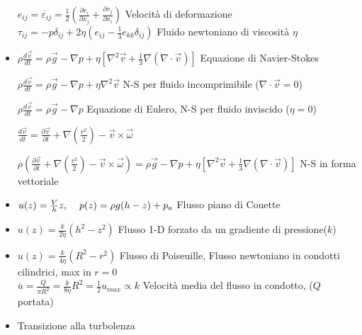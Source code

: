 \documentclass[a4paper]{article}
\begin{document}
\begin{itemize}
	$e_{ij}= \dot{\varepsilon_{ij}}= \frac{1}{2}(\frac{\partial v_i}{\partial x_j}+\frac{\partial v_j}{\partial x_i})$ Velocità di deformazione\\
	$\tau_{ij}=-p \delta_{ij} + 2 \eta (e_{ij}-\frac{1}{3}e_{kk}\delta_{ij})$ Fluido newtoniano di viscosità $\eta$
	
	\item $\rho \frac{d \overrightarrow{v}}{dt} = \rho \overrightarrow{g}- \nabla p + \eta[\nabla^2 \overrightarrow{v} + \frac{1}{3}\nabla(\nabla \cdot \overrightarrow{v})]$ \hspace{0.3cm} Equazione di Navier-Stokes
	
	$\rho \frac{d \overrightarrow{v}}{dt} = \rho \overrightarrow{g}- \nabla p + \eta\nabla^2 \overrightarrow{v}$ \hspace{0.3cm} N-S per fluido incomprimibile ($\nabla \cdot \overrightarrow{v}=0$)
	
	$\rho \frac{d \overrightarrow{v}}{dt} = \rho \overrightarrow{g}- \nabla p$ \hspace{0.3cm} Equazione di Eulero, N-S per fluido inviscido ($\eta = 0$)
	
	$\frac{d\overrightarrow{v}}{dt}=\frac{\partial \overrightarrow{v}}{\partial t}+\nabla (\frac{v^2}{2})-\overrightarrow{v} \times \overrightarrow{\omega}$
	
	$\rho  (\frac{\partial \overrightarrow{v}}{\partial t}+\nabla (\frac{v^2}{2})-\overrightarrow{v} \times \overrightarrow{\omega}) = \rho \overrightarrow{g}- \nabla p + \eta[\nabla^2 \overrightarrow{v} + \frac{1}{3}\nabla(\nabla \cdot \overrightarrow{v})]$ \hspace{0.3cm} N-S in forma vettoriale
	
	\item $u(z) = \frac{V}{h}z, \hspace{0.4cm} p(z)=\rho g (h-z)+p_a$ Flusso piano di Couette
	
	\item $u(z)=\frac{k}{2 \eta} (h^2-z^2) $ Flusso 1-D forzato da un gradiente di pressione($k$)
	
	\item $u(z)=\frac{k}{4 \eta} (R^2-r^2) $ Flusso di Poiseuille, Flusso newtoniano in condotti cilindrici, max in $r=0$\\
	$\overline{u}=\frac{Q}{\pi R^2}=\frac{k}{8\eta}R^2=\frac{1}{2}u_{max}\propto k$ Velocità media del flusso in condotto, ($Q$ portata)
	
	\item Transizione alla turbolenza
	

\end{itemize}
\end{document}
